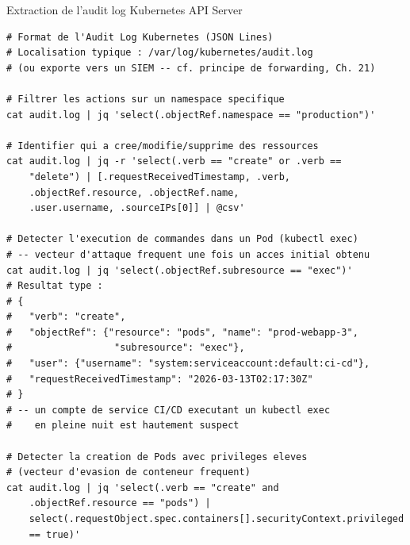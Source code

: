 \begin{boxoutils}{Extraction de l'audit log Kubernetes API Server}
\begin{lstlisting}[language=bash_forensique]
# Format de l'Audit Log Kubernetes (JSON Lines)
# Localisation typique : /var/log/kubernetes/audit.log
# (ou exporte vers un SIEM -- cf. principe de forwarding, Ch. 21)

# Filtrer les actions sur un namespace specifique
cat audit.log | jq 'select(.objectRef.namespace == "production")'

# Identifier qui a cree/modifie/supprime des ressources
cat audit.log | jq -r 'select(.verb == "create" or .verb ==
    "delete") | [.requestReceivedTimestamp, .verb,
    .objectRef.resource, .objectRef.name,
    .user.username, .sourceIPs[0]] | @csv'

# Detecter l'execution de commandes dans un Pod (kubectl exec)
# -- vecteur d'attaque frequent une fois un acces initial obtenu
cat audit.log | jq 'select(.objectRef.subresource == "exec")'
# Resultat type :
# {
#   "verb": "create",
#   "objectRef": {"resource": "pods", "name": "prod-webapp-3",
#                  "subresource": "exec"},
#   "user": {"username": "system:serviceaccount:default:ci-cd"},
#   "requestReceivedTimestamp": "2026-03-13T02:17:30Z"
# }
# -- un compte de service CI/CD executant un kubectl exec
#    en pleine nuit est hautement suspect

# Detecter la creation de Pods avec privileges eleves
# (vecteur d'evasion de conteneur frequent)
cat audit.log | jq 'select(.verb == "create" and
    .objectRef.resource == "pods") |
    select(.requestObject.spec.containers[].securityContext.privileged
    == true)'
\end{lstlisting}
\end{boxoutils}

